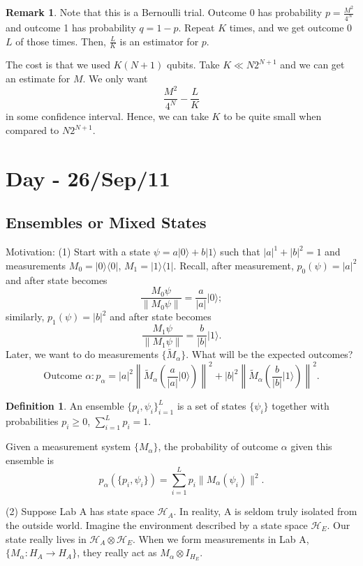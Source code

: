 \documentclass[12pt]{article}
\theoremstyle{definition}
\newtheorem*{definition}{Definition}
\newtheorem*{remark}{Remark}
\newcommand{\ket}[1]{|#1\rangle}
\newcommand{\ketbra}[2]{|#1\rangle\langle #2|}
\begin{document}
\begin{remark}
Note that this is a Bernoulli trial. Outcome 0 has probability $p = \frac{M^2}{4^N}$ and outcome 1 has probability $q = 1-p$. Repeat $K$ times, and we get outcome 0 $L$ of those times. Then, $\frac{L}{K}$ is an estimator for $p$.

The cost is that we used $K(N+1)$ qubits. Take $K \ll N2^{N+1}$ and we can get an estimate for $M$. We only want
\[
\frac{M^2}{4^N} - \frac{L}{K}
\]
in some confidence interval. Hence, we can take $K$ to be quite small when compared to $N2^{N+1}$.
\end{remark}

\section{Day - 26/Sep/11}

\subsection{Ensembles or Mixed States}

Motivation: (1) Start with a state $\psi = a\ket{0} + b\ket{1}$ such that $|a|^1 + |b|^2 = 1$ and measurements $M_0 = \ketbra{0}{0}$, $M_1 = \ketbra{1}{1}$. Recall, after measurement, $p_0(\psi) = |a|^2$ and after state becomes
\[
\frac{M_0\psi}{\|M_0\psi\|} = \frac{a}{|a|}\ket{0};
\]
similarly, $p_1(\psi) = |b|^2$ and after state becomes
\[
\frac{M_1\psi}{\|M_1\psi\|} = \frac{b}{|b|}\ket{1}.
\]
Later, we want to do measurements $\{\tilde{M}_\alpha\}$. What will be the expected outcomes?
\[
\text{Outcome } \alpha: p_\alpha = |a|^2 \left\|\tilde{M}_\alpha\left(\frac{a}{|a|}\ket{0}\right)\right\|^2 + |b|^2 \left\|\tilde{M}_\alpha\left(\frac{b}{|b|}\ket{1}\right)\right\|^2.
\]

\begin{definition}
An ensemble $\{p_i, \psi_i\}_{i=1}^L$ is a set of states $\{\psi_i\}$ together with probabilities $p_i \geq 0$, $\sum_{i=1}^L p_i = 1$.
\end{definition}
Given a measurement system $\{M_\alpha\}$, the probability of outcome $\alpha$ given this ensemble is
\[
p_\alpha(\{p_i, \psi_i\}) = \sum_{i=1}^L p_i \|M_\alpha(\psi_i)\|^2.
\]

(2) Suppose Lab A has state space $\mathcal{H}_A$. In reality, A is seldom truly isolated from the outside world. Imagine the environment described by a state space $\mathcal{H}_E$. Our state really lives in $\mathcal{H}_A \otimes \mathcal{H}_E$. When we form measurements in Lab A, $\{M_\alpha : H_A \to H_A\}$, they really act as $M_\alpha \otimes I_{H_E}$.
\end{document}
